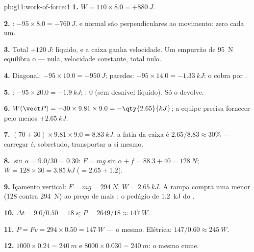 \begin{solution}{pb:g11:work-of-force:1}
\textbf{1.} $W = 110 \times 8.0 = +\qty{880}{J}$.

\textbf{2.} : $-95 \times 8.0 = -\qty{760}{J}$.  e  normal
são perpendiculares ao movimento: zero cada um.

\textbf{3.} Total $+\qty{120}{J}$:  líquido, e a caixa
ganha velocidade. Um empurrão de \qty{95}{N} equilibra o  ---
 nula, velocidade constante,  total nulo.

\textbf{4.} Diagonal: $-95 \times 10.0 = -\qty{950}{J}$; paredes:
$-95 \times 14.0 = -\qty{1.33}{kJ}$: o  cobra por .

\textbf{5.} : $-95 \times 20.0 = -\qty{1.9}{kJ}$; : $0$ (sem
desnível líquido). Só o  devolve.

\textbf{6.} $W(\vect P) = -30 \times 9.81 \times 9.0 = -\qty{2.65}{kJ}$;
a equipe precisa fornecer pelo menos $+\qty{2.65}{kJ}$.

\textbf{7.} $(70 + 30) \times 9.81 \times 9.0 = \qty{8.83}{kJ}$; a fatia
da caixa é $2.65/8.83 \approx 30\%$ --- carregar é, sobretudo,
transportar a si mesmo.

\textbf{8.} $\sin\alpha = 9.0/30 = 0.30$:
$F = mg\sin\alpha + f = 88.3 + 40 = \qty{128}{N}$;
$W = 128 \times 30 = \qty{3.85}{kJ}$ ($= 2.65 + 1.2$).

\textbf{9.} Içamento vertical: $F = mg = \qty{294}{N}$,
$W = \qty{2.65}{kJ}$. A rampa compra uma  menor ($128$ contra
\qty{294}{N}) ao preço de mais : o pedágio de \qty{1.2}{kJ} do
.

\textbf{10.} $\Delta t = 9.0/0.50 = \qty{18}{s}$;
$P = 2649/18 \approx \qty{147}{W}$.

\textbf{11.} $P = Fv = 294 \times 0.50 = \qty{147}{W}$ --- o mesmo.
Elétrica: $147/0.60 \approx \qty{245}{W}$.

\textbf{12.} $1000 \times 0.24 = \qty{240}{m}$ e
$8000 \times 0.030 = \qty{240}{m}$: o mesmo cume.


\end{solution}
